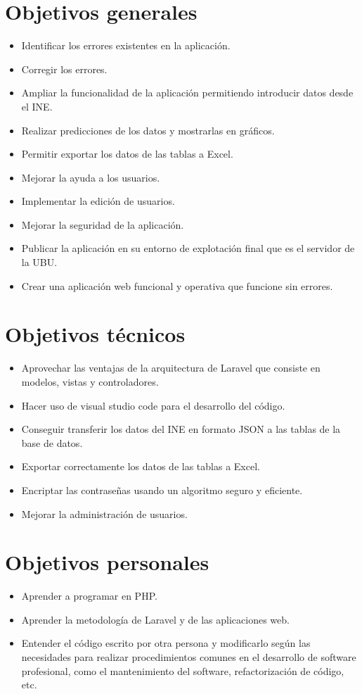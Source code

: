 \section{Objetivos generales}
\begin{itemize}
	\item Identificar los errores existentes en la aplicación. 
	\item Corregir los errores. 
	\item Ampliar la funcionalidad de la aplicación permitiendo introducir datos desde el INE.
	\item Realizar predicciones de los datos y mostrarlas en gráficos.
	\item Permitir exportar los datos de las tablas a Excel.
	\item Mejorar la ayuda a los usuarios.
	\item Implementar la edición de usuarios.
	\item Mejorar la seguridad de la aplicación.
	\item Publicar la aplicación en su entorno de explotación final que es el servidor de la UBU.
	\item Crear una aplicación web funcional y operativa que funcione sin errores.
\end{itemize}
\section{Objetivos técnicos}
\begin{itemize}
	\item Aprovechar las ventajas de la arquitectura de Laravel que consiste en modelos, vistas y controladores.
	\item Hacer uso de visual studio code para el desarrollo del código.
	\item Conseguir transferir los datos del INE en formato JSON a las tablas de la base de datos.
	\item Exportar correctamente los datos de las tablas a Excel.
	\item Encriptar las contraseñas usando un algoritmo seguro y eficiente.
	\item Mejorar la administración de usuarios.
\end{itemize}
\section{Objetivos personales}
\begin{itemize}
	\item Aprender a programar en PHP.
	\item Aprender la metodología de Laravel y de las aplicaciones web.
	\item Entender el código escrito por otra persona y modificarlo según las necesidades para realizar procedimientos comunes en el desarrollo de software profesional, como el mantenimiento del software, refactorización de código, etc.
	
\end{itemize}